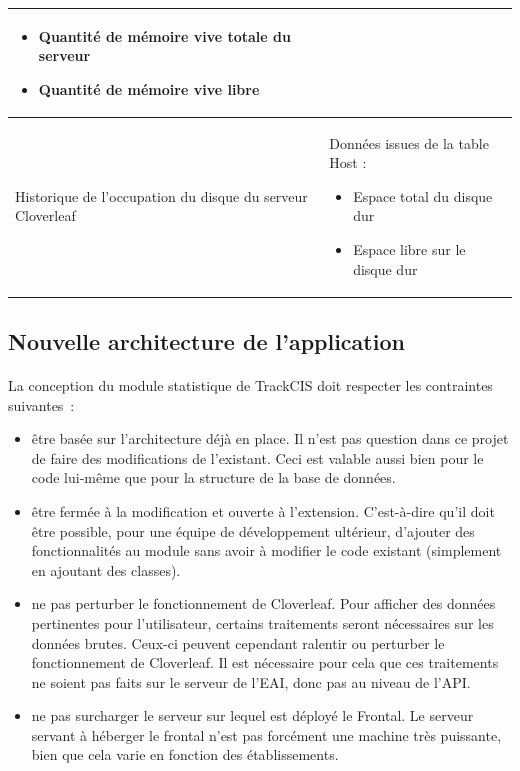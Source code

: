 \begin{table}[H]
\begin{tabular}{| p{5cm} | p{8cm} |}
\begin{itemize}
						  \item Quantité de mémoire vive totale du serveur
						  \item Quantité de mémoire vive libre
						\end{itemize}
						\\
					\hline
						Historique de l'occupation du disque du serveur Cloverleaf
						&
						Données issues de la table Host :
						\begin{itemize}
						  \item Espace total du disque dur
						  \item Espace libre sur le disque dur
						\end{itemize}
						\\
					\hline
				\end{tabular}
			\end{table}
		
		
		\subsection{Nouvelle architecture de l'application}
			\paragraph{}%
			La conception du module statistique de TrackCIS doit respecter les
			contraintes suivantes~:
			\begin{itemize}%
			  \item être basée sur l'architecture déjà en place. Il n'est pas question
			  dans ce projet de faire des modifications de l'existant. Ceci est
			  valable aussi bien pour le code lui-même que pour la structure de la base
			  de données.
			  \item être fermée à la modification et ouverte à l'extension. C'est-à-dire
			  qu'il doit être possible, pour une équipe de développement ultérieur,
			  d'ajouter des fonctionnalités au module sans avoir à modifier le code
			  existant (simplement en ajoutant des classes).
			  \item ne pas perturber le fonctionnement de Cloverleaf. Pour afficher des
			  données pertinentes pour l'utilisateur, certains traitements seront
			  nécessaires sur les données brutes. Ceux-ci peuvent cependant ralentir ou
			  perturber le fonctionnement de Cloverleaf. Il est nécessaire pour cela que
			  ces traitements ne soient pas faits sur le serveur de l'EAI, donc pas au
			  niveau de l'API.
			  \item ne pas surcharger le serveur sur lequel est déployé le Frontal. Le
			  serveur servant à héberger le frontal n'est pas forcément une machine très
			  puissante, bien que cela varie en fonction des établissements.
			\end{itemize}
			

